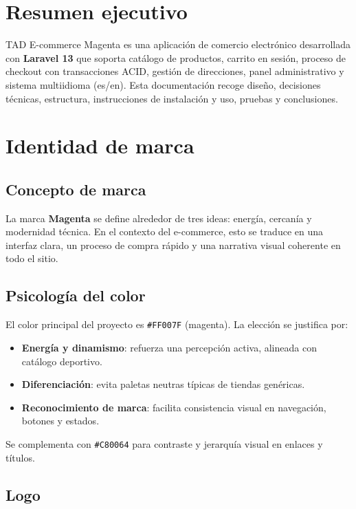 \documentclass[12pt,a4paper]{report}
\begin{document}
\tableofcontents
\cleardoublepage


\chapter{Resumen ejecutivo}

TAD E-commerce Magenta es una aplicación de comercio electrónico desarrollada con \textbf{Laravel 13} que soporta catálogo de productos, carrito en sesión, proceso de checkout con transacciones ACID, gestión de direcciones, panel administrativo y sistema multiidioma (es/en). Esta documentación recoge diseño, decisiones técnicas, estructura, instrucciones de instalación y uso, pruebas y conclusiones.

\chapter{Identidad de marca}

\section{Concepto de marca}

La marca \textbf{Magenta} se define alrededor de tres ideas: energía, cercanía y modernidad técnica. En el contexto del e-commerce, esto se traduce en una interfaz clara, un proceso de compra rápido y una narrativa visual coherente en todo el sitio.

\section{Psicología del color}

El color principal del proyecto es \texttt{\#FF007F} (magenta). La elección se justifica por:
\begin{itemize}
  \item \textbf{Energía y dinamismo}: refuerza una percepción activa, alineada con catálogo deportivo.
  \item \textbf{Diferenciación}: evita paletas neutras típicas de tiendas genéricas.
  \item \textbf{Reconocimiento de marca}: facilita consistencia visual en navegación, botones y estados.
\end{itemize}

Se complementa con \texttt{\#C80064} para contraste y jerarquía visual en enlaces y títulos.

\section{Logo}
\end{document}
